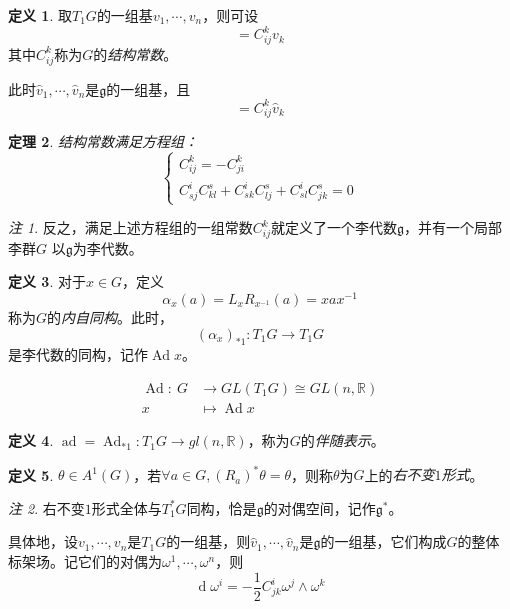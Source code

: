 \documentclass[winfonts,UTF8,c5size,a4paper,fancyhdr,hyperref,titlepage,nocap]{ctexart}
\newtheorem{thm}{定理}
\theoremstyle{definition}
\newtheorem{defn}[thm]{定义}
\theoremstyle{remark}
\newtheorem*{rem}{注}
\numberwithin{equation}{subsection}
\newcommand{\Real}{\mathbb{R}}
\newcommand{\g}{\mathfrak{g}}
\newcommand{\red}{\color{red}}
\newcommand{\dd}{\operatorname{d}}
\newcommand{\mapdes}[5]
  {
    \begin{align*}
      #1\colon\  #2 & \longrightarrow  #3 \\
            #4 & \mapsto  #5
    \end{align*}
  }
\newcommand{\Ad}{\operatorname{Ad}}
\newcommand{\ad}{\operatorname{ad}}
\begin{document}
\begin{defn}
取$T_1G$的一组基$v_1,\cdots,v_n$，则可设
\begin{equation*}
[v_i,v_j]=C^k_{ij}v_k
\end{equation*}
其中$C^k_{ij}$称为$G$的\emph{\red 结构常数}。
\end{defn}
此时$\widehat{v}_1,\cdots,\widehat{v}_n$是$\g$的一组基，且
\begin{equation*}
[\widehat{v}_i,\widehat{v}_j]=C^k_{ij}\widehat{v}_k
\end{equation*}
\begin{thm}
  结构常数满足方程组：
\begin{equation*}
  \begin{cases}
    C^k_{ij}=-C^k_{ji}\\
    C^i_{sj}C^s_{kl}+C^i_{sk}C^s_{lj}+C^i_{sl}C^s_{jk}=0
  \end{cases}
\end{equation*}
\end{thm}
\begin{rem}
  反之，满足上述方程组的一组常数$C^k_{ij}$就定义了一个李代数$\g$，并有一个局部李群$G$ 以$\g$为李代数。
\end{rem}

\begin{defn}
  对于$x\in G$，定义
  \begin{equation*}
    \alpha_x(a)=L_xR_{x^{-1}}(a)=xax^{-1}
  \end{equation*}
称为$G$的\emph{\red 内自同构}。此时，
  \begin{equation*}
    (\alpha_x)_{\ast1}\colon T_1G\longrightarrow T_1G
  \end{equation*}
是李代数的同构，记作$\Ad x$。
\end{defn}
\mapdes{\Ad}{G}{GL(T_1G)\cong GL(n,\Real)}{x}{\Ad x}
\begin{defn}
$\ad=\Ad_{\ast1}\colon T_1G\to gl(n,\Real)$，称为$G$的\emph{\red 伴随表示}。
\end{defn}

\begin{defn}
$\theta\in A^1(G)$，若$\forall a\in G, (R_a)^{\ast}\theta=\theta$，则称$\theta$为$G$上的\emph{\red 右不变$1$形式}。
\end{defn}
\begin{rem}
右不变$1$形式全体与$T^{\ast}_1G$同构，恰是$\g$的对偶空间，记作$\g^{\ast}$。

具体地，设$v_1,\cdots,v_n$是$T_1G$的一组基，则$\widehat{v}_1,\cdots,\widehat{v}_n$是$\g$的一组基，它们构成$G$的整体标架场。记它们的对偶为$\omega^1,\cdots,\omega^n$，则
\begin{equation*}
\dd\omega^i=-\frac{1}{2}C^i_{jk}\omega^j\wedge\omega^k
\end{equation*}
\end{rem}
\end{document}
